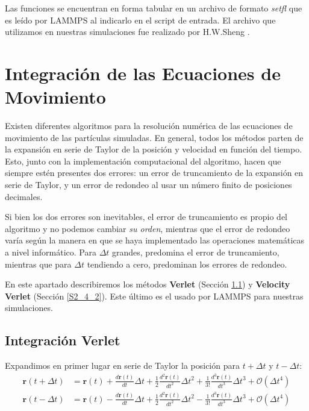 Las funciones se encuentran en forma tabular en un archivo de formato \textit{setfl} \citep{setfl} que es leído por LAMMPS al indicarlo en el script de entrada. El archivo que utilizamos en nuestras simulaciones fue realizado por H.W.Sheng \citep{cheng09}.

\section{Integración de las Ecuaciones de Movimiento}
\label{S2_4}

Existen diferentes algoritmos para la resolución numérica de las ecuaciones de movimiento de las partículas simuladas. En general, todos los métodos parten de la expansión en serie de Taylor de la posición y velocidad en función del tiempo. Esto, junto con la implementación computacional del algoritmo, hacen que siempre estén presentes dos errores: un error de truncamiento de la expansión en serie de Taylor, y un error de redondeo al usar un número finito de posiciones decimales.

Si bien los dos errores son inevitables, el error de truncamiento es propio del algoritmo y no podemos cambiar \textit{su orden}, mientras que el error de redondeo varía según la manera en que se haya implementado las operaciones matemáticas a nivel informático. Para $\Delta{}t$ grandes, predomina el error de truncamiento, mientras que para $\Delta{}t$ tendiendo a cero, predominan los errores de redondeo.

En este apartado describiremos los métodos \textbf{Verlet} (Sección \ref{S2_4_1}) y \textbf{Velocity Verlet} (Sección \ref{S2_4_2}). Este último es el usado por LAMMPS para nuestras simulaciones.

\subsection{Integración Verlet}
\label{S2_4_1}

Expandimos en primer lugar en serie de Taylor la posición para $t+\Delta{}t$ y $t-\Delta{}t$:
\vspace{-0.3pt}
\begin{align}
\mathbf{r}(t+\Delta{}t) & = \mathbf{r}(t)+\frac{d\mathbf{r}(t)}{dt} \Delta{}t + \frac{1}{2} \frac{d^{2}\mathbf{r}(t)}{dt^{2}} \Delta{}t^{2} + \frac{1}{3!} \frac{d^{3}\mathbf{r}(t)}{dt^{3}} \Delta{}t^{3} + \mathcal{O}(\Delta{}t^{4})
\label{C2:eq:VerletTaylor1} \\
\mathbf{r}(t-\Delta{}t) & = \mathbf{r}(t)-\frac{d\mathbf{r}(t)}{dt} \Delta{}t + \frac{1}{2} \frac{d^{2}\mathbf{r}(t)}{dt^{2}} \Delta{}t^{2} - \frac{1}{3!} \frac{d^{3}\mathbf{r}(t)}{dt^{3}} \Delta{}t^{3} + \mathcal{O}(\Delta{}t^{4})
\label{C2:eq:VerletTaylor2}
\end{align}

